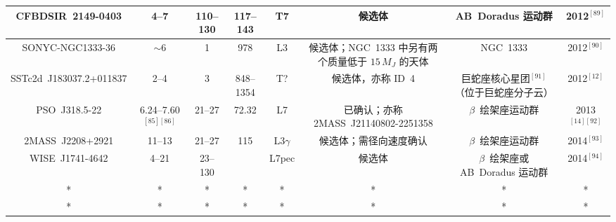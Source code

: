 \begin{table}[ht]
\begin{tabular}{|c|c|c|c|c|c|c|c|}
\hline
CFBDSIR~2149-0403 & 4--7 & 110--130 & 117--143 & T7 & 候选体 & AB~Doradus 运动群 & 2012$^{[89]}$\\
\hline
SONYC-NGC1333-36 & $\sim6$ & 1 & 978 & L3 & 候选体；NGC~1333 中另有两个质量低于 $15\,M_J$ 的天体 & NGC~1333 & 2012$^{[90]}$\\
\hline
SSTc2d~J183037.2+011837 & 2--4 & 3 & 848--1354 & T? & 候选体，亦称 ID~4  & 巨蛇座核心星团$^{[91]}$（位于巨蛇座分子云） & 2012$^{[12]}$\\
\hline
PSO~J318.5-22 & 6.24--7.60$^{[85][86]}$ & 21--27 & 72.32 & L7 & 已确认；亦称 2MASS~J21140802-2251358 & $\beta$~绘架座运动群 & 2013$^{[14][92]}$\\
\hline
2MASS~J2208+2921 & 11--13  & 21--27 & 115 & L3$\gamma$ & 候选体；需径向速度确认 & $\beta$~绘架座运动群 & 2014$^{[93]}$\\
\hline
WISE~J1741-4642 & 4--21 & 23--130 &  & L7pec  & 候选体  & $\beta$~绘架座或 AB~Doradus 运动群 & 2014$^{[94]}$\\
\hline
* & * & * & * & * & * & * & * \\
\hline
* & * & * & * & * & * & * & * \\
\hline
\end{tabular}
\end{table}
